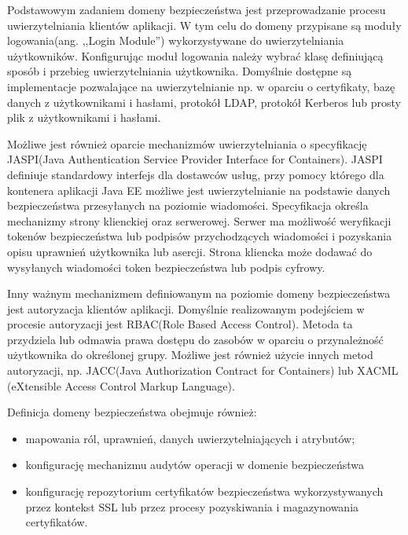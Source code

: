 		Podstawowym zadaniem domeny bezpieczeństwa jest przeprowadzanie procesu uwierzytelniania klientów aplikacji. W tym celu do domeny przypisane są moduły logowania(ang. ,,Login Module'') wykorzystywane do uwierzytelniania użytkowników. Konfigurując moduł logowania należy wybrać klasę definiującą sposób i przebieg uwierzytelniania użytkownika. Domyślnie dostępne są implementacje pozwalające na uwierzytelnianie np. w oparciu o certyfikaty, bazę danych z użytkownikami i hasłami, protokół LDAP, protokół Kerberos lub prosty plik z użytkownikami i hasłami.

		Możliwe jest również oparcie mechanizmów uwierzytelniania o specyfikację JASPI(Java Authentication Service Provider Interface for Containers). JASPI definiuje standardowy interfejs dla dostawców usług, przy pomocy którego dla kontenera aplikacji Java EE możliwe jest uwierzytelnianie na podstawie danych bezpieczeństwa przesyłanych na poziomie wiadomości. Specyfikacja określa mechanizmy strony klienckiej oraz serwerowej. Serwer ma możliwość weryfikacji tokenów bezpieczeństwa lub podpisów przychodzących wiadomości i pozyskania opisu uprawnień użytkownika lub asercji. Strona kliencka może dodawać do wysyłanych wiadomości token bezpieczeństwa lub podpis cyfrowy. 

		Inny ważnym mechanizmem definiowanym na poziomie domeny bezpieczeństwa jest autoryzacja klientów aplikacji. Domyślnie realizowanym podejściem w procesie autoryzacji jest RBAC(Role Based Access Control). Metoda ta przydziela lub odmawia prawa dostępu do zasobów w oparciu o przynależność użytkownika do określonej grupy. Możliwe jest również użycie innych metod autoryzacji, np. JACC(Java Authorization Contract for Containers) lub XACML (eXtensible Access Control Markup Language). 

		Definicja domeny bezpieczeństwa obejmuje również:

		\begin{itemize}
			\item mapowania ról, uprawnień, danych uwierzytelniających i atrybutów; 
			\item konfigurację mechanizmu audytów operacji w domenie bezpieczeństwa
			\item konfigurację repozytorium certyfikatów bezpieczeństwa wykorzystywanych przez kontekst SSL lub przez procesy pozyskiwania i magazynowania certyfikatów.
		\end{itemize}


